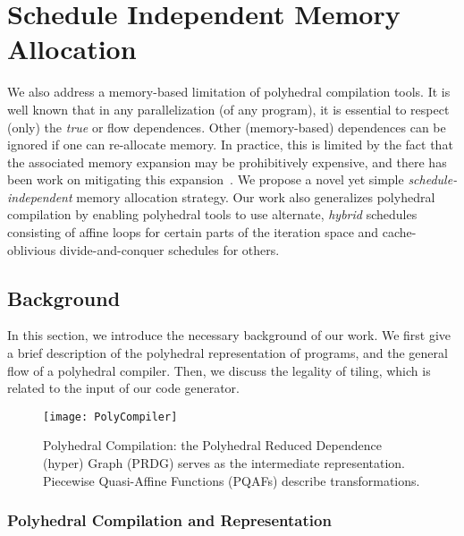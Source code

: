 \section{Schedule Independent Memory Allocation}
\label{sec:sima}

We also address a memory-based limitation of polyhedral compilation
tools.  It is well known that in any parallelization (of any program), it is
essential to respect (only) the \emph{true} or flow dependences.  Other
(memory-based) dependences can be ignored if one can re-allocate memory.  In
practice, this is limited by the fact that the associated memory expansion may
be prohibitively expensive, and there has been work on mitigating this
expansion~\cite{vasilache-impact12, lefebvre-feautrier-pc98, sanjay-europar96,
  sanjay-toplas00}.  We propose a novel yet simple \emph{schedule-independent}
memory allocation strategy.  Our work also generalizes polyhedral compilation
by enabling polyhedral tools to use alternate, \emph{hybrid} schedules
consisting of affine loops for certain parts of the iteration space and
cache-oblivious divide-and-conquer schedules for others.


\subsection{Background}

In this section, we introduce the necessary background of our work. We first
give a brief description of the polyhedral representation of programs, and the
general flow of a polyhedral compiler.  Then, we discuss the legality of
tiling, which is related to the input of our code generator.

\begin{figure*}[tb]
  \centering %
  \texttt{[image: PolyCompiler]}
  \caption{\small{Polyhedral Compilation: the Polyhedral Reduced Dependence
      (hyper) Graph (PRDG) serves as the intermediate representation.
      Piecewise Quasi-Affine Functions (PQAFs) describe transformations.}}
  \label{fig:compiler}
\end{figure*}

\subsubsection{Polyhedral Compilation and Representation}

